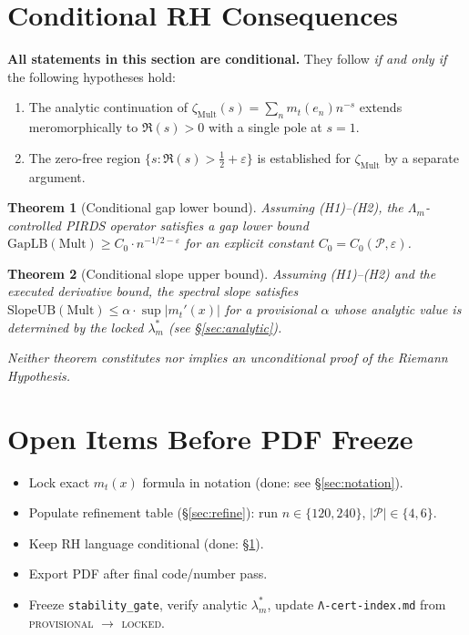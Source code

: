 \documentclass[11pt]{article}
\newtheorem{theorem}{Theorem}
\newcommand{\Mult}{\mathrm{Mult}}
\begin{document}
\section{Conditional RH Consequences}
\label{sec:rh}

\textbf{All statements in this section are conditional.}
They follow \emph{if and only if} the following hypotheses hold:
\begin{enumerate}
    \item[(H1)] The analytic continuation of
    $\zeta_\Mult(s) = \sum_n m_t(e_n) n^{-s}$
    extends meromorphically to $\Re(s) > 0$ with a single pole at $s=1$.
    \item[(H2)] The zero-free region
    $\{s : \Re(s) > \tfrac{1}{2} + \varepsilon\}$
    is established for $\zeta_\Mult$ by a separate argument.
\end{enumerate}

\begin{theorem}[Conditional gap lower bound]
Assuming (H1)--(H2), the $\Lambda_m$-controlled PIRDS operator
satisfies a gap lower bound
$\mathrm{GapLB}(\Mult) \geq C_0 \cdot n^{-1/2-\varepsilon}$
for an explicit constant $C_0 = C_0(\mathcal{P}, \varepsilon)$.
\end{theorem}

\begin{theorem}[Conditional slope upper bound]
Assuming (H1)--(H2) and the executed derivative bound,
the spectral slope satisfies
$\mathrm{SlopeUB}(\Mult) \leq \alpha \cdot \sup|m_t'(x)|$
for a provisional $\alpha$ whose analytic value is determined
by the locked $\lambda_m^*$ (see \S\ref{sec:analytic}).
\end{theorem}

\noindent\textit{Neither theorem constitutes nor implies an
unconditional proof of the Riemann Hypothesis.}

\section{Open Items Before PDF Freeze}
\label{sec:open}

\begin{itemize}
    \item[$\square$] Lock exact $m_t(x)$ formula in notation
          (done: see \S\ref{sec:notation}).
    \item[$\square$] Populate refinement table
          (\S\ref{sec:refine}): run $n \in \{120, 240\}$,
          $|\mathcal{P}| \in \{4, 6\}$.
    \item[$\square$] Keep RH language conditional
          (done: \S\ref{sec:rh}).
    \item[$\square$] Export PDF after final code/number pass.
    \item[$\square$] Freeze \texttt{stability\_gate},
          verify analytic $\lambda_m^*$, update
          \texttt{Λ-cert-index.md} from
          \textsc{provisional} $\to$ \textsc{locked}.
\end{itemize}
\end{document}
